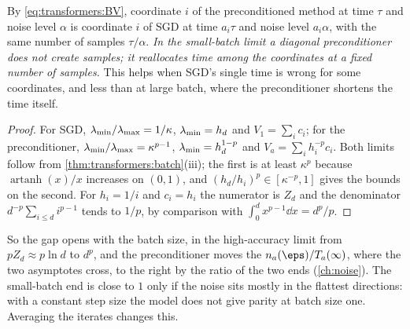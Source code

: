\begin{refsection}
By \eqref{eq:transformers:BV}, coordinate $i$ of the preconditioned method at time $\tau$ and noise level $\alpha$ is coordinate $i$ of SGD at time $a_i\tau$ and noise level $a_i\alpha$, with the same number of samples $\tau/\alpha$. \emph{In the small-batch limit a diagonal preconditioner does not create samples; it reallocates time among the coordinates at a fixed number of samples.} This helps when SGD's single time is wrong for some coordinates, and less than at large batch, where the preconditioner shortens the time itself.


\begin{proof}
For SGD, $\lambda_{\min}/\lambda_{\max}=1/\kappa$, $\lambda_{\min}=h_d$ and $V_1=\sum_ic_i$; for the preconditioner, $\lambda_{\min}/\lambda_{\max}=\kappa^{p-1}$, $\lambda_{\min}=h_d^{1-p}$ and $V_a=\sum_ih_i^{-p}c_i$. Both limits follow from \cref{thm:transformers:batch}(iii); the first is at least $\kappa^p$ because $\operatorname{artanh}(x)/x$ increases on $(0,1)$, and $(h_d/h_i)^p\in[\kappa^{-p},1]$ gives the bounds on the second. For $h_i=1/i$ and $c_i=h_i$ the numerator is $Z_d$ and the denominator $d^{-p}\sum_{i\le d}i^{p-1}$ tends to $1/p$, by comparison with $\int_0^dx^{p-1}\dd x=d^p/p$.
\end{proof}

So the gap opens with the batch size, in the high-accuracy limit from $pZ_d\approx p\ln d$ to $d^p$, and the preconditioner moves the  $n_a(\eps)/T_a(\infty)$, where the two asymptotes cross, to the right by the ratio of the two ends (\cref{ch:noise}). The small-batch end is close to $1$ only if the noise sits mostly in the flattest directions: with a constant step size the model does not give parity at batch size one. Averaging the iterates changes this.


\end{refsection}
